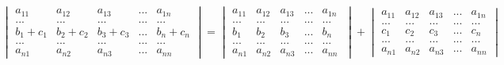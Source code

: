 \documentclass[blue,normal,cn]{elegantnote}
\begin{document}
\begin{property}
    \begin{equation*}
        \begin{vmatrix} 
            a_{11}&a_{12} & a_{13} &...& a_{1n}\\
            ...&...&...&...&...\\
            b_1+c_1&b_2+c_2 & b_3+c_3 &...& b_n+c_n\\
            ...&...&...&...&...\\
            a_{n1}&a_{n2} & a_{n3} &...& a_{nn}
        \end{vmatrix}
       =
       \begin{vmatrix} 
        a_{11}&a_{12} & a_{13} &...& a_{1n}\\
        ...&...&...&...&...\\
        b_1&b_2 & b_3 &...& b_n\\
        ...&...&...&...&...\\
        a_{n1}&a_{n2} & a_{n3} &...& a_{nn}\
        \end{vmatrix}
        +
        \begin{vmatrix} 
            a_{11}&a_{12} & a_{13} &...& a_{1n}\\
            ...&...&...&...&...\\
            c_1&c_2 & c_3 &...& c_n\\
            ...&...&...&...&...\\
            a_{n1}&a_{n2} & a_{n3} &...& a_{nn}
        \end{vmatrix}
    \end{equation*}
    \end{property}
\end{document}
